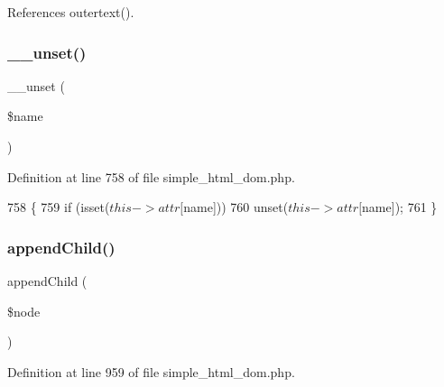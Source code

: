 References outertext().


\hypertarget{classsimple__html__dom__node_a8a93654c7bfe3f0a9bb7af531e513d44}{}\label{classsimple__html__dom__node_a8a93654c7bfe3f0a9bb7af531e513d44} 
\subsubsection{\texorpdfstring{\+\_\+\+\_\+unset()}{\_\_unset()}}
{\footnotesize\ttfamily \+\_\+\+\_\+unset (\begin{DoxyParamCaption}\item[{}]{\$name }\end{DoxyParamCaption})}



Definition at line 758 of file simple\+\_\+html\+\_\+dom.\+php.


\begin{DoxyCode}
758                             \{
759         \textcolor{keywordflow}{if} (isset($this->attr[$name]))
760             unset($this->attr[$name]);
761     \}
\end{DoxyCode}
\hypertarget{classsimple__html__dom__node_ae1d4fc95e0556bcc5970086f5c24aa3e}{}\label{classsimple__html__dom__node_ae1d4fc95e0556bcc5970086f5c24aa3e} 
\subsubsection{\texorpdfstring{append\+Child()}{appendChild()}}
{\footnotesize\ttfamily append\+Child (\begin{DoxyParamCaption}\item[{}]{\$node }\end{DoxyParamCaption})}



Definition at line 959 of file simple\+\_\+html\+\_\+dom.\+php.


